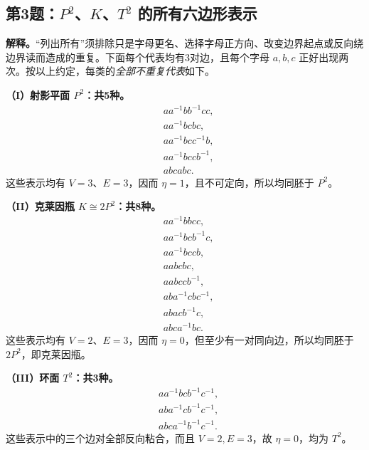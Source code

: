 \documentclass[UTF8,11pt,a4paper]{ctexart}
\begin{document}
\clearpage
\subsection*{第3题：\(P^2\)、\(K\)、\(T^2\) 的所有六边形表示}
\textbf{解释。}\;“列出所有”须排除只是字母更名、选择字母正方向、改变边界起点或反向绕边界读而造成的重复。下面每个代表均有3对边，且每个字母 \(a,b,c\) 正好出现两次。按以上约定，每类的\emph{全部不重复代表}如下。

\textbf{（I）射影平面 \(P^2\)：共5种。}
\[
 \boxed{\begin{aligned}
 &aa^{-1}bb^{-1}cc,\\
 &aa^{-1}bcbc,\\
 &aa^{-1}bcc^{-1}b,\\
 &aa^{-1}bccb^{-1},\\
 &abcabc.
 \end{aligned}}
\]
这些表示均有 \(V=3\)、\(E=3\)，因而 \(\eta=1\)，且不可定向，所以均同胚于 \(P^2\)。

\textbf{（II）克莱因瓶 \(K\cong2P^2\)：共8种。}
\[
 \boxed{\begin{aligned}
 &aa^{-1}bbcc,\\
 &aa^{-1}bcb^{-1}c,\\
 &aa^{-1}bccb,\\
 &aabcbc,\\
 &aabccb^{-1},\\
 &aba^{-1}cbc^{-1},\\
 &abacb^{-1}c,\\
 &abca^{-1}bc.
 \end{aligned}}
\]
这些表示均有 \(V=2\)、\(E=3\)，因而 \(\eta=0\)，但至少有一对同向边，所以均同胚于 \(2P^2\)，即克莱因瓶。

\textbf{（III）环面 \(T^2\)：共3种。}
\[
 \boxed{\begin{aligned}
 &aa^{-1}bcb^{-1}c^{-1},\\
 &aba^{-1}cb^{-1}c^{-1},\\
 &abca^{-1}b^{-1}c^{-1}.
 \end{aligned}}
\]
这些表示中的三个边对全部反向粘合，而且 \(V=2,E=3\)，故 \(\eta=0\)，均为 \(T^2\)。
\end{document}

